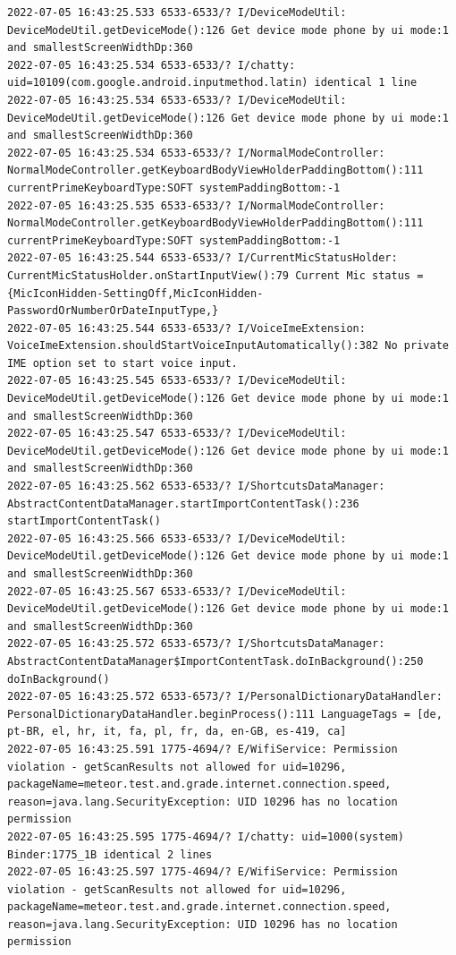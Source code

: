 \documentclass[a4paper,12pt]{book}
\begin{document}
\begin{lstlisting}
2022-07-05 16:43:25.533 6533-6533/? I/DeviceModeUtil: DeviceModeUtil.getDeviceMode():126 Get device mode phone by ui mode:1 and smallestScreenWidthDp:360
2022-07-05 16:43:25.534 6533-6533/? I/chatty: uid=10109(com.google.android.inputmethod.latin) identical 1 line
2022-07-05 16:43:25.534 6533-6533/? I/DeviceModeUtil: DeviceModeUtil.getDeviceMode():126 Get device mode phone by ui mode:1 and smallestScreenWidthDp:360
2022-07-05 16:43:25.534 6533-6533/? I/NormalModeController: NormalModeController.getKeyboardBodyViewHolderPaddingBottom():111 currentPrimeKeyboardType:SOFT systemPaddingBottom:-1
2022-07-05 16:43:25.535 6533-6533/? I/NormalModeController: NormalModeController.getKeyboardBodyViewHolderPaddingBottom():111 currentPrimeKeyboardType:SOFT systemPaddingBottom:-1
2022-07-05 16:43:25.544 6533-6533/? I/CurrentMicStatusHolder: CurrentMicStatusHolder.onStartInputView():79 Current Mic status = {MicIconHidden-SettingOff,MicIconHidden-PasswordOrNumberOrDateInputType,}
2022-07-05 16:43:25.544 6533-6533/? I/VoiceImeExtension: VoiceImeExtension.shouldStartVoiceInputAutomatically():382 No private IME option set to start voice input.
2022-07-05 16:43:25.545 6533-6533/? I/DeviceModeUtil: DeviceModeUtil.getDeviceMode():126 Get device mode phone by ui mode:1 and smallestScreenWidthDp:360
2022-07-05 16:43:25.547 6533-6533/? I/DeviceModeUtil: DeviceModeUtil.getDeviceMode():126 Get device mode phone by ui mode:1 and smallestScreenWidthDp:360
2022-07-05 16:43:25.562 6533-6533/? I/ShortcutsDataManager: AbstractContentDataManager.startImportContentTask():236 startImportContentTask()
2022-07-05 16:43:25.566 6533-6533/? I/DeviceModeUtil: DeviceModeUtil.getDeviceMode():126 Get device mode phone by ui mode:1 and smallestScreenWidthDp:360
2022-07-05 16:43:25.567 6533-6533/? I/DeviceModeUtil: DeviceModeUtil.getDeviceMode():126 Get device mode phone by ui mode:1 and smallestScreenWidthDp:360
2022-07-05 16:43:25.572 6533-6573/? I/ShortcutsDataManager: AbstractContentDataManager$ImportContentTask.doInBackground():250 doInBackground()
2022-07-05 16:43:25.572 6533-6573/? I/PersonalDictionaryDataHandler: PersonalDictionaryDataHandler.beginProcess():111 LanguageTags = [de, pt-BR, el, hr, it, fa, pl, fr, da, en-GB, es-419, ca]
2022-07-05 16:43:25.591 1775-4694/? E/WifiService: Permission violation - getScanResults not allowed for uid=10296, packageName=meteor.test.and.grade.internet.connection.speed, reason=java.lang.SecurityException: UID 10296 has no location permission
2022-07-05 16:43:25.595 1775-4694/? I/chatty: uid=1000(system) Binder:1775_1B identical 2 lines
2022-07-05 16:43:25.597 1775-4694/? E/WifiService: Permission violation - getScanResults not allowed for uid=10296, packageName=meteor.test.and.grade.internet.connection.speed, reason=java.lang.SecurityException: UID 10296 has no location permission

\end{lstlisting}
\end{document}
